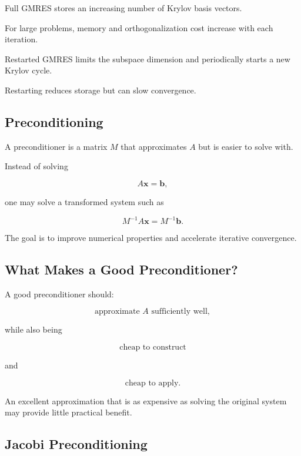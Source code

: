 Full GMRES stores an increasing number of Krylov basis vectors.

For large problems, memory and orthogonalization cost increase with each
iteration.

Restarted GMRES limits the subspace dimension and periodically starts a
new Krylov cycle.

Restarting reduces storage but can slow convergence.

\subsection{Preconditioning}
\label{subsec:preconditioning}

A preconditioner is a matrix \(M\) that approximates \(A\) but is easier to
solve with.

Instead of solving

\[
A\mathbf{x}
=
\mathbf{b},
\]

one may solve a transformed system such as

\[
\boxed{
M^{-1}A\mathbf{x}
=
M^{-1}\mathbf{b}.
}
\]

The goal is to improve numerical properties and accelerate iterative
convergence.

\subsection{What Makes a Good Preconditioner?}
\label{subsec:good-preconditioner}

A good preconditioner should:

\[
\boxed{
\text{approximate }A\text{ sufficiently well},
}
\]

while also being

\[
\boxed{
\text{cheap to construct}
}
\]

and

\[
\boxed{
\text{cheap to apply}.
}
\]

An excellent approximation that is as expensive as solving the original
system may provide little practical benefit.

\subsection{Jacobi Preconditioning}
\label{subsec:jacobi-preconditioning}


